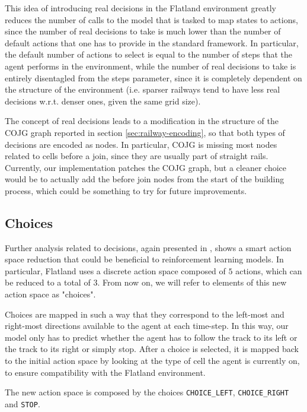\documentclass[a4paper,10pt]{report}
\begin{document}
This idea of introducing real decisions in the Flatland environment greatly reduces the number of calls to the model that is tasked to map states to actions, since the number of real decisions to take is much lower than the number of default actions that one has to provide in the standard framework. In particular, the default number of actions to select is equal to the number of steps that the agent performs in the environment, while the number of real decisions to take is entirely disentagled from the steps parameter, since it is completely dependent on the structure of the environment (i.e. sparser railways tend to have less real decisions w.r.t. denser ones, given the same grid size).

The concept of real decisions leads to a modification in the structure of the COJG graph reported in section \ref{sec:railway-encoding}, so that both types of decisions are encoded as nodes. In particular, COJG is missing most nodes related to cells before a join, since they are usually part of straight rails. Currently, our implementation patches the COJG graph, but a cleaner choice would be to actually add the before join nodes from the start of the building process, which could be something to try for future improvements. 

\subsection{Choices}\label{subsec:choices}
Further analysis related to decisions, again presented in \cite{jonas}, shows a smart action space reduction that could be beneficial to reinforcement learning models. In particular, Flatland uses a discrete action space composed of $5$ actions, which can be reduced to a total of $3$. From now on, we will refer to elements of this new action space as "choices". 

Choices are mapped in such a way that they correspond to the left-most and right-most directions available to the agent at each time-step. In this way, our model only has to predict whether the agent has to follow the track to its left or the track to its right or simply stop. After a choice is selected, it is mapped back to the initial action space by looking at the type of cell the agent is currently on, to ensure compatibility with the Flatland environment.

The new action space is composed by the choices \texttt{CHOICE_LEFT}, \texttt{CHOICE_RIGHT} and \texttt{STOP}.
\end{document}
